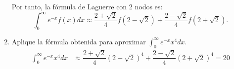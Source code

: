 \begin{ejercicio}
\begin{enumerate}
        Por tanto, la fórmula de Laguerre con 2 nodos es:
        \begin{equation*}
            \int_{0}^{\infty} e^{-x} f(x) dx \approx \dfrac{2 + \sqrt{2}}{4}f(2 - \sqrt{2}) + \dfrac{2 - \sqrt{2}}{4}f(2 + \sqrt{2}).
        \end{equation*}
        \item Aplique la fórmula obtenida para aproximar $\int_{0}^{\infty} e^{-x} x^4 dx$.
        \begin{align*}
            \int_{0}^{\infty} e^{-x} x^4 dx &\approx \dfrac{2 + \sqrt{2}}{4}(2 - \sqrt{2})^4 + \dfrac{2 - \sqrt{2}}{4}(2 + \sqrt{2})^4 =  20
        \end{align*}
    \end{enumerate}
\end{ejercicio}


